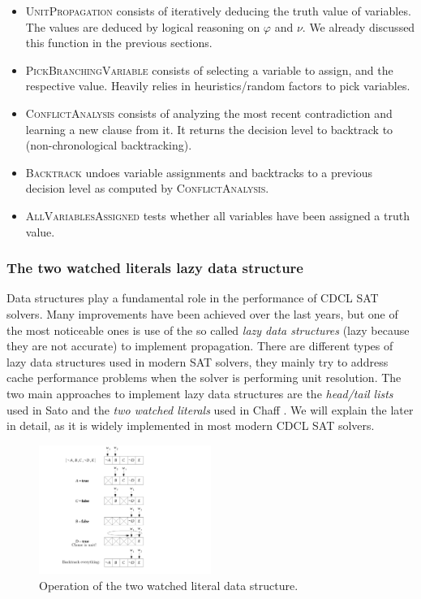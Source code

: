\documentclass[12pt]{diicc}
\begin{document}
\begin{itemize}
	\item \textsc{UnitPropagation} consists of iteratively deducing the truth value of variables. The values are deduced by logical reasoning on $\varphi$ and $\nu$. We already discussed this function in the previous sections.
	\item \textsc{PickBranchingVariable} consists of selecting a variable to assign, and the respective value. Heavily relies in heuristics/random factors to pick variables.
	\item \textsc{ConflictAnalysis} consists of analyzing the most recent contradiction and learning a new clause from it. It returns the decision level to backtrack to (non-chronological backtracking).
	\item \textsc{Backtrack} undoes variable assignments and backtracks to a previous decision level as computed by \textsc{ConflictAnalysis}.
	\item \textsc{AllVariablesAssigned} tests whether all variables have been assigned a truth value.
\end{itemize}


\subsubsection{The two watched literals lazy data structure}

Data structures play a fundamental role in the performance of CDCL SAT solvers. Many improvements have been achieved over the last years, but one of the most noticeable ones is use of the so called \textit{lazy data structures} (lazy because they are not accurate) to implement propagation. There are different types of lazy data structures used in modern SAT solvers, they mainly try to address cache performance problems when the solver is performing unit resolution. The two main approaches to implement lazy data structures are the \textit{head/tail lists} used in Sato \cite{sato} and the \textit{two watched literals} used in Chaff \cite{chaff}. We will explain the later in detail, as it is widely implemented in most modern CDCL SAT solvers.

\begin{figure}[h!]
	\centering
		\includegraphics[width=0.5\textwidth]{watchedliterals}
	\caption{Operation of the two watched literal data structure.}
	\label{fig:watched literals}
\end{figure}
\end{document}
